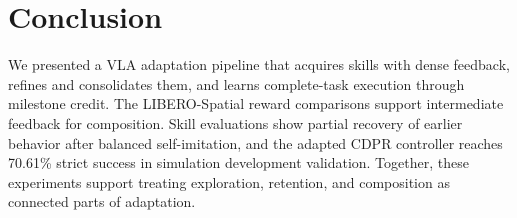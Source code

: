 \section{Conclusion}\label{sec:conclusion}
We presented a VLA adaptation pipeline that acquires skills with dense feedback, refines and consolidates them, and learns complete-task execution through milestone credit. The LIBERO-Spatial reward comparisons support intermediate feedback for composition. Skill evaluations show partial recovery of earlier behavior after balanced self-imitation, and the adapted CDPR controller reaches 70.61\% strict success in simulation development validation. Together, these experiments support treating exploration, retention, and composition as connected parts of adaptation.
